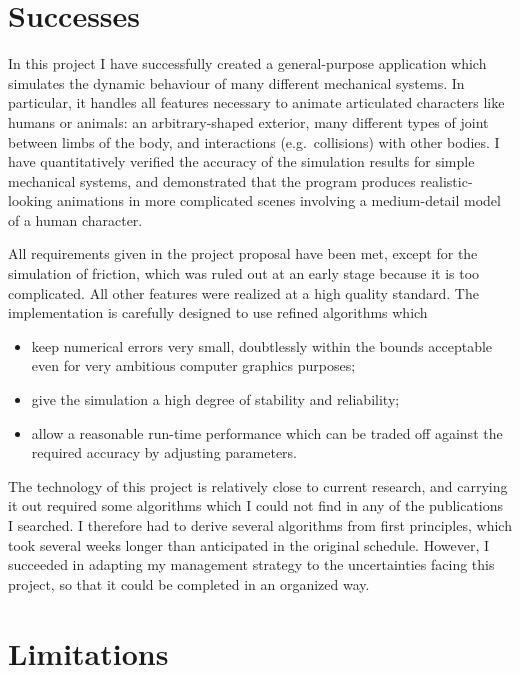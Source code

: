 \section{Successes}

In this project I have successfully created a general-purpose application which simulates
the dynamic behaviour of many different mechanical systems. In particular, it handles all
features necessary to animate articulated characters like humans or animals: an
arbitrary-shaped exterior, many different types of joint between limbs of the body, and
interactions (e.g.\ collisions) with other bodies. I have quantitatively verified the accuracy
of the simulation results for simple mechanical systems, and demonstrated that the program
produces realistic-looking animations in more complicated scenes involving a medium-detail
model of a human character.

All requirements given in the project proposal have been met, except for the simulation of friction,
which was ruled out at an early stage because it is too complicated. All other features were
realized at a high quality standard. The implementation is carefully designed to use refined
algorithms which 
\begin{itemize}
\item keep numerical errors very small, doubtlessly within the bounds acceptable even for very
    ambitious computer graphics purposes;
\item give the simulation a high degree of stability and reliability;
\item allow a reasonable run-time performance which can be traded off against the required
    accuracy by adjusting parameters.
\end{itemize}

The technology of this project is relatively close to current research, and carrying it out
required some algorithms which I could not find in any of the publications I searched. I therefore
had to derive several algorithms from first principles, which took several weeks longer than
anticipated in the original schedule. However, I succeeded in adapting my management strategy
to the uncertainties facing this project, so that it could be completed in an organized way.

\section{Limitations}


